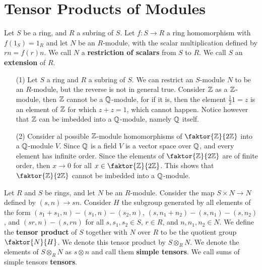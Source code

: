 \section{Tensor Products of Modules}

\begin{definition}
    Let $S$ be a ring, and $R$ a subring of $S$. Let $f:S
    \xrightarrow{} R$ a ring homomorphism with $f(1_S)=1_R$ and let $N$ be an
    $R$-module, with the scalar multiplication defined by $rn=f(r)n$. We call
    $N$ a \textbf{restriction of scalars} from $S$ to $R$. We call $S$ an
    \textbf{extension} of $R$.
\end{definition}

\begin{example}\label{example_4.8}
    \begin{enumerate}
        \item[(1)] Let $S$ a  ring and $R$ a subring of $S$. We can
            restrict an $S$-module $N$ to be an $R$-module, but the reverse is
            not in general true. Consider $\mathbb{Z}$ as a $\mathbb{Z}$-module, then $\mathbb{Z}$ cannot
            be a $\mathbb{Q}$-module, for if it is, then the element $\frac{1}{2}1=z$ is
            an element of $\mathbb{Z}$ for which $z+z=1$, which cannot happen. Notice
            however that $\mathbb{Z}$ can be imbedded into a $\mathbb{Q}$-module, namely $\mathbb{Q}$ itself.

        \item[(2)] Consider al possible $\mathbb{Z}$-module homomorphisms of
            $\faktor{\Z}{2\Z}$ into a $\mathbb{Q}$-module $V$. Since $\mathbb{Q}$ is a field $V$
            is a vector space over $\mathbb{Q}$, and every element has infinite order.
            Since the elements of $\faktor{\Z}{2\Z}$ are of finite order, then
            $x \xrightarrow{} 0$ for all $x \in \faktor{\Z}{2\Z}$. This shows
            that $\faktor{\Z}{2\Z}$ cannot be imbedded into a $\mathbb{Q}$-module.
    \end{enumerate}
\end{example}

\begin{definition}
    Let $R$ and $S$ be rings, and let $N$ be an $R$-module. Consider the map $S
    \times N \xrightarrow{} N$ defined by $(s,n) \xrightarrow{} sn$. Consider
    $H$ the subgroup generated by all elements of the form
    $(s_1+s_1,n)-(s_1,n)-(s_2,n)$, $(s,n_1+n_2)-(s,n_1)-(s,n_2)$, and
    $(sr,n)-(s,rn)$ for all $s,s_1,s_2 \in S$, $r \in R$, and $n,n_1,n_2 \in N$.
    We define the \textbf{tensor product} of $S$ together with  $N$ over $R$ to
    be the quotient group $\faktor{N}{H}$. We denote this tensor product by $S
    \otimes_R N$. We denote the elements of $S \otimes_R N$ as $s \otimes n$ and
    call them \textbf{simple tensors}. We call sums of simple tensors
    \textbf{tensors}.
\end{definition}


